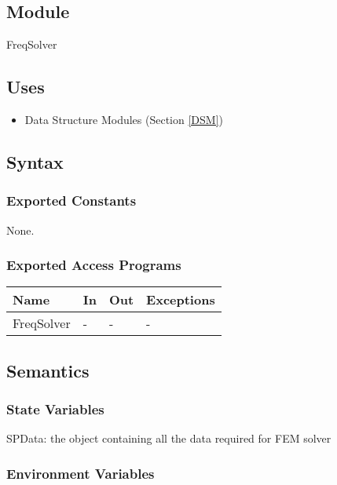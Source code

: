 \documentclass[12pt, titlepage]{article}
\begin{document}
	
	\subsection{Module} FreqSolver
	
	
	\subsection{Uses} \begin{itemize} \item Data Structure Modules (Section
		\ref{DSM}) \end{itemize}
	
	\subsection{Syntax}
	
	\subsubsection{Exported Constants} None. \subsubsection{Exported Access
		Programs}
	
	\begin{center} \begin{tabular}{p{2cm} p{4cm} p{4cm} p{2cm}} \hline
			\textbf{Name} & \textbf{In} & \textbf{Out} & \textbf{Exceptions} \\ \hline
			FreqSolver & - & - & - \\ \hline \end{tabular} \end{center}
	
	\subsection{Semantics}
	
	\subsubsection{State Variables}
	
	SPData: the object containing all the data required for FEM solver
	
	\subsubsection{Environment Variables}
	
\end{document}
